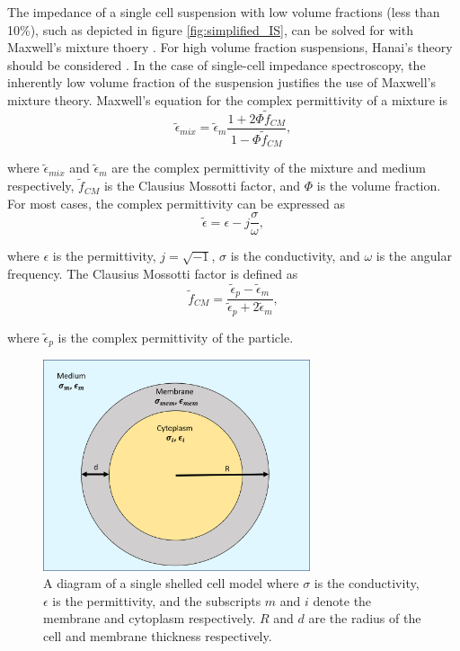   \par The impedance of a single cell suspension with low volume fractions (less than 10\%), such as depicted in figure \ref{fig:simplified_IS}, can be solved for with Maxwell's mixture thoery \cite{james_clerk_maxwell_treatise_1892, sun_single-cell_2010}. For high volume fraction suspensions, Hanai's theory should be considered \cite{hanai_theory_1960}. In the case of single-cell impedance spectroscopy, the inherently low volume fraction of the suspension justifies the use of Maxwell's mixture theory.  Maxwell's equation for the complex permittivity of a mixture is
  \begin{equation}
      \tilde{\epsilon}_{mix} = \tilde{\epsilon}_m\frac{1 + 2\Phi\tilde{f}_{CM}}{1-\Phi\tilde{f}_{CM}},
  \end{equation}
  
  \noindent where $\tilde{\epsilon}_{mix}$ and $\tilde{\epsilon}_m$ are the complex permittivity of the mixture and medium respectively, $\tilde{f}_{CM}$ is the Clausius Mossotti factor, and $\Phi$ is the volume fraction. For most cases, the complex permittivity can be expressed as
  \begin{equation}
    \tilde{\epsilon} = \epsilon - j\frac{\sigma}{\omega},
\end{equation}

\noindent where $\epsilon$ is the permittivity, $j = \sqrt{-1}$, $\sigma$ is the conductivity, and $\omega$ is the angular frequency. The Clausius Mossotti factor is defined as
  \begin{equation}
    \tilde{f}_{CM} = \frac{\tilde{\epsilon}_p - \tilde{\epsilon}_m}{\tilde{\epsilon}_p + 2\tilde{\epsilon}_m}, 
  \end{equation}
  
  \noindent where $\tilde{\epsilon}_p$ is the complex permittivity of the particle.

 \begin{figure}[ht]
 \centering
 \includegraphics[width=0.7\textwidth]{images/singleShelledCell.png}
 \caption[Diagram of single shelled cell model.]{A diagram of a single shelled cell model where $\sigma$ is the conductivity, $\epsilon$ is the permittivity, and the subscripts $m$ and $i$ denote the membrane and cytoplasm respectively. $R$ and $d$ are the radius of the cell and membrane thickness respectively.}
 \label{fig:single_shell}
 \end{figure}

